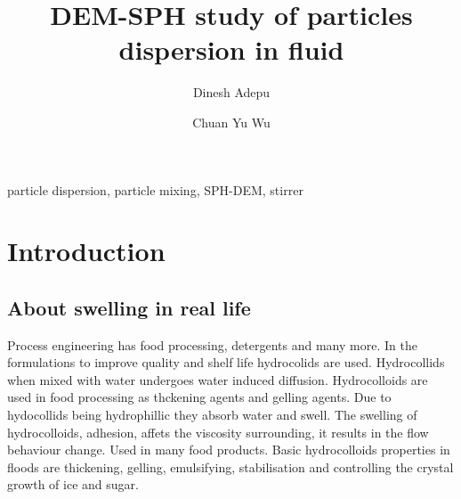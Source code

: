\documentclass[preprint,12pt]{elsarticle}
\begin{document}
\begin{frontmatter}

  \title{{DEM}-{SPH} study of particles dispersion in fluid}
  \author[XXX]{Dinesh Adepu}
  \author[University of Surrey]{Chuan Yu Wu}
\address[xxx]{xxx}



\begin{abstract}

\end{abstract}

\begin{keyword}
{particle dispersion}, {particle mixing}, {SPH-DEM}, {stirrer}


\end{keyword}

\end{frontmatter}



\FloatBarrier%
\section{Introduction}


\subsection*{About swelling in real life}

Process engineering has food processing, detergents and many more. In the
formulations to improve quality and shelf life hydrocolids are
used. Hydrocollids when mixed with water undergoes water induced
diffusion. Hydrocolloids are used in food processing as thckening agents and
gelling agents. Due to hydocollids being hydrophillic they absorb water and
swell. The swelling of hydrocolloids, adhesion, affets the viscosity
surrounding, it results in the flow behaviour change. Used in many food
products. Basic hydrocolloids properties in floods are thickening, gelling,
emulsifying, stabilisation and controlling the crystal growth of ice and
sugar.


\end{document}

